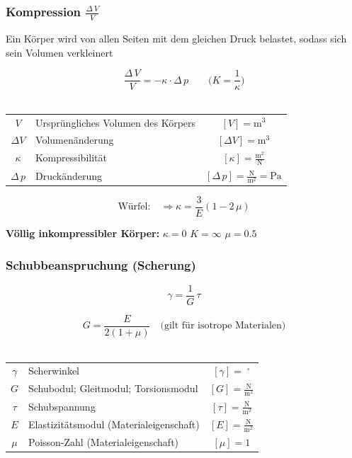 		\subsubsection{Kompression $\frac{\Delta \, V}{V}$}
			Ein Körper wird von allen Seiten mit dem gleichen Druck belastet, sodass sich sein Volumen verkleinert 
			
			$$ \boxed{ \frac{\Delta \, V}{V} = - \kappa \cdot \Delta \, p } \qquad \Big( K = \frac{1}{\kappa} \Big) $$ \\ 
			
			\begin{tabular}{c l c}
				$V$ & Ursprüngliches Volumen des Körpers & $[V] = \mathrm{m^3}$ \\
				$\Delta V$ & Volumenänderung & $[\Delta V] = \mathrm{m^3}$ \\
				$\kappa$ & Kompressibilität & $[\kappa] = \mathrm{\frac{m^2}{N}}$ \\
				$\Delta \, p$ & Druckänderung & $[\Delta \, p] = \mathrm{\frac{N}{m^2} = Pa}$  \\ 
			\end{tabular}
			
			$$ \boxed{ \text{Würfel:} \quad \Rightarrow \kappa = \frac{3}{E} (1 - 2 \, \mu) }$$ 
			
			\textbf{Völlig inkompressibler Körper:} $\kappa = 0$  \qquad $K = \infty$ \qquad $\mu = 0.5$

		\subsubsection{Schubbeanspruchung (Scherung)}
		
			$$ \boxed{ \gamma = \frac{1}{G} \, \tau }$$ 
			
			$$ \boxed{ G = \frac{E}{2(1 + \mu)}  \quad \text{(gilt für isotrope Materialen)} } $$\\

			\begin{tabular}{c l c}
				$\gamma$ & Scherwinkel & $[\gamma] = \; ^\circ $ \\
				\rule{0pt}{10pt}$G$ & Schubodul; Gleitmodul; Torsionsmodul & $[G] = \mathrm{\frac{N}{m^2}}$ \\
				\rule{0pt}{10pt}$\tau$ & Schubspannung & $[\tau] = \mathrm{\frac{N}{m^2}}$ \\
				\rule{0pt}{10pt}$E$ & Elastizitätsmodul (Materialeigenschaft) & $[E] = \mathrm{\frac{N}{m^2}}$ \\
				$\mu$ & Poisson-Zahl (Materialeigenschaft) & $[\mu] = 1$ \\
			\end{tabular}

